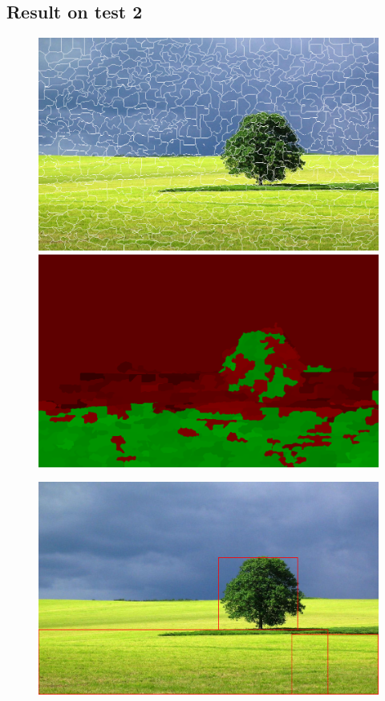 \documentclass[a4paper,titlepaget]{article}
\begin{document}
\subsection{Result on test 2}
\begin{figure}[htpb] 
	\centering
	\begin{minipage}{.3\textwidth}
		\includegraphics[width=1.7\textwidth]{images/results/2seg} 
	\end{minipage}
	\hspace{.25\textwidth}
	\begin{minipage}{.3\textwidth}
		\includegraphics[width=1.7\textwidth]{images/results/2map}
	\end{minipage}  
\end{figure}
\begin{figure}[htpb]
	\centering
	\includegraphics[width=.9\textwidth]{images/results/2fin}
\end{figure}
\end{document}
